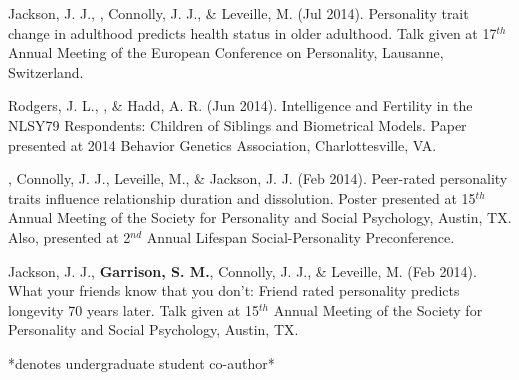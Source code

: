 \item Jackson, J. J., \meb, Connolly, J. J., \& Leveille, M. (Jul 2014). Personality trait change in adulthood predicts health status in older adulthood. Talk given at 17$^{th}$ Annual Meeting of the European Conference on Personality, Lausanne, Switzerland.
\item Rodgers, J. L., \meb, \& Hadd, A. R. (Jun 2014). Intelligence and Fertility in the NLSY79 Respondents: Children of Siblings and Biometrical Models. Paper presented at 2014 Behavior Genetics Association, Charlottesville, VA. 
\item\meb, Connolly, J. J., Leveille, M., \& Jackson, J. J. (Feb 2014). Peer-rated personality traits influence relationship duration and dissolution. Poster presented at 15$^{th}$ Annual Meeting of the Society for Personality and Social Psychology, Austin, TX. Also, presented at 2$^{nd}$ Annual Lifespan Social-Personality  Preconference.
\item Jackson, J. J., \textbf{Garrison, S. M.}, Connolly, J. J., \& Leveille, M. (Feb 2014). What your friends know that you don't: Friend rated personality predicts longevity 70 years later. Talk given at 15$^{th}$ Annual Meeting of the Society for Personality and  Social Psychology, Austin, TX.
\vspace{-2mm}\begin{center}\footnotesize{*denotes undergraduate student co-author*}\end{center} \vspace{-3mm}
